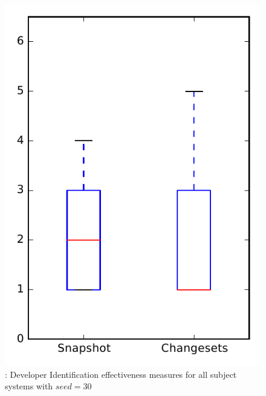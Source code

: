 
\begin{figure}
\centering
\includegraphics[height=0.4\textheight]{figures/dit_seed/rq1_overview_30}
\caption{\rtwo: Developer Identification effectiveness measures for all subject systems with $seed=30$}
\label{fig:dit_seed:rq1:overview}
\end{figure}
